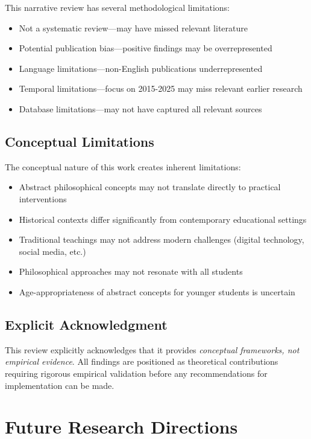 \documentclass[12pt,a4paper,twocolumn]{article}
\begin{document}
This narrative review has several methodological limitations:
\begin{itemize}
    \item Not a systematic review—may have missed relevant literature
    \item Potential publication bias—positive findings may be overrepresented
    \item Language limitations—non-English publications underrepresented
    \item Temporal limitations—focus on 2015-2025 may miss relevant earlier research
    \item Database limitations—may not have captured all relevant sources
\end{itemize}

\subsection{Conceptual Limitations}

The conceptual nature of this work creates inherent limitations:
\begin{itemize}
    \item Abstract philosophical concepts may not translate directly to practical interventions
    \item Historical contexts differ significantly from contemporary educational settings
    \item Traditional teachings may not address modern challenges (digital technology, social media, etc.)
    \item Philosophical approaches may not resonate with all students
    \item Age-appropriateness of abstract concepts for younger students is uncertain
\end{itemize}

\subsection{Explicit Acknowledgment}

This review explicitly acknowledges that it provides \textit{conceptual frameworks, not empirical evidence}. All findings are positioned as theoretical contributions requiring rigorous empirical validation before any recommendations for implementation can be made.

\newpage

\section{Future Research Directions}
\end{document}
